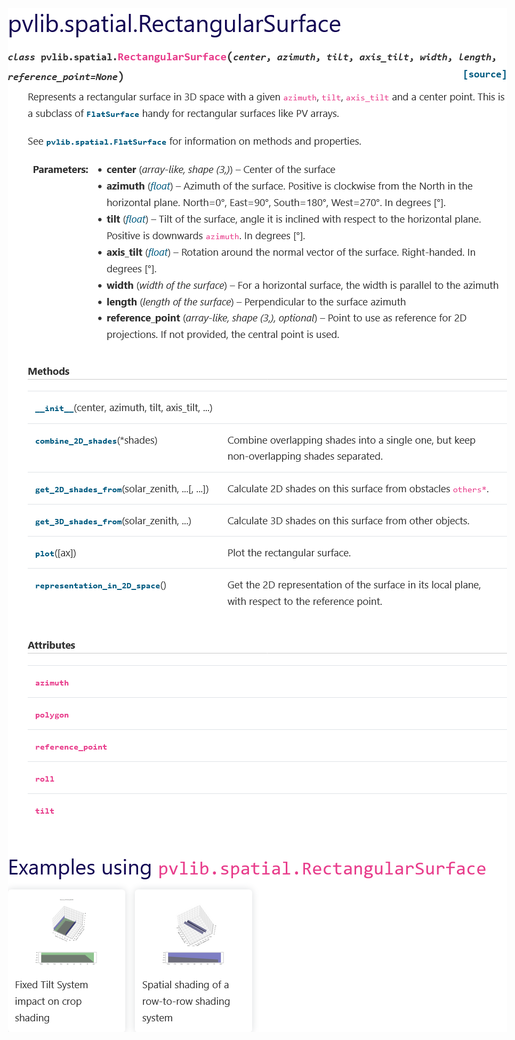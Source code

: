 \begin{myparindent}{0pt}
\includegraphics[width=\linewidth,height=0.9\textheight,keepaspectratio]{images/docs_funcs/pvlib.spatial.RectangularSurface.png}

\end{myparindent}
